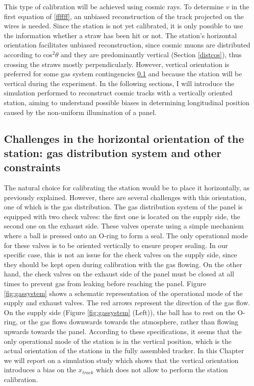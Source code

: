 This type of calibration will be achieved using cosmic rays. 
To determine $v$ in the first equation of \ref{ffffff}, 
an unbiased reconstruction of the 
track projected on the wires is needed.
Since the station is not yet calibrated, it is only possible 
to use the information whether a straw has been hit or not. 
The station's horizontal orientation facilitates unbiased 
reconstruction, since cosmic muons are distributed according to 
cos$^2\theta$ and they are predominantly vertical 
(Section \ref{distcos}), 
thus crossing the straws mostly perpendicularly.
However, vertical orientation is preferred for some gas system contingencies 
\ref{gassystem} and because the station will 
be vertical during the experiment. 
In the following sections, I will introduce the simulation performed to reconstruct cosmic tracks with 
a vertically oriented station, aiming to understand possible biases in determining longitudinal position caused by the non-uniform illumination of a panel.
\subsection{Challenges in the horizontal orientation 
of the station: gas distribution system and other constraints}\label{gassystem}
The natural choice for calibrating the station would 
be to place it horizontally, as previously explained. 
However, there are several challenges with this orientation, 
one of which is the gas distribution. The gas distribution 
system of the panel is equipped 
with two check valves: the first one is located on 
the supply side, the second one on the exhaust side. 
These valves operate using a simple mechanism where 
a ball is pressed onto an O-ring to form a seal. The 
only operational mode for these valves is to be oriented 
vertically to ensure proper sealing. In our specific 
case, this is not an issue for the check valves on the 
supply side, since they should be kept open during 
calibration with the gas flowing. On the other hand, 
the check valves on the exhaust side of the panel must 
be closed at all times to prevent gas from leaking before 
reaching the panel. 
Figure \ref{fig:gassystem} shows a schematic 
representation of the operational mode of the supply 
and exhaust valves. The red arrows represent the 
direction of the gas flow. On the supply side (Figure 
\ref{fig:gassystem} (Left)), the ball has to rest on the 
O-ring, or the gas flows downwards towards the atmosphere, 
rather than flowing upwards towards the panel. According 
to these specifications, it seems that the only operational 
mode of the station is in the vertical position, which is 
the actual orientation of the stations in the fully assembled 
tracker. In this Chapter we will report on a simulation study 
which shows that the vertical orientation introduces a bias on 
the $x_{track}$ which does not allow to perform the station 
calibration. 

